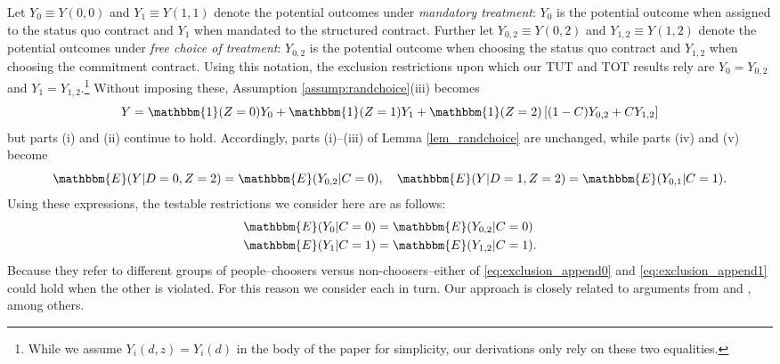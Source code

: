 \begin{appendix}
Let $Y_0 \equiv Y(0,0)$ and $Y_1 \equiv Y(1,1)$ denote the potential outcomes under \emph{mandatory treatment}: $Y_0$ is the potential outcome when assigned to the status quo contract and $Y_1$ when mandated to the structured contract. 
Further let $Y_{0,2} \equiv Y(0,2)$ and $Y_{1,2} \equiv Y(1,2)$ denote the potential outcomes under \emph{free choice of treatment}: $Y_{0,2}$ is the potential outcome when choosing the status quo contract and $Y_{1,2}$ when choosing the commitment contract. 
Using this notation, the exclusion restrictions upon which our TUT and TOT results rely are $Y_0 = Y_{0,2}$ and $Y_1 = Y_{1,2}$.\footnote{While we assume $Y_i(d,z) = Y_i(d)$ in the body of the paper for simplicity, our derivations only rely on these two equalities.}
Without imposing these, Assumption \ref{assump:randchoice}(iii) becomes 
\[
Y = \mathbbm{1}(Z =0) Y_{0} + \mathbbm{1}(Z = 1)  Y_{1}  + \mathbbm{1}(Z = 2) \left[(1 - C) Y_{0,2} + C Y_{1,2} \right]
\]
but parts (i) and (ii) continue to hold.
Accordingly, parts (i)--(iii) of Lemma \ref{lem_randchoice} are unchanged, while parts (iv) and (v) become
\[
\mathbbm{E}(Y|D=0,Z=2) = \mathbbm{E}(Y_{0,2}|C=0), \quad
\mathbbm{E}(Y|D=1,Z=2) = \mathbbm{E}(Y_{0,1}|C=1).
\]
Using these expressions, the testable restrictions we consider here are as follows:
\begin{align}
\label{eq:exclusion_append0}
\mathbbm{E}(Y_0|C=0) &= \mathbbm{E}(Y_{0,2}|C=0) \\
\label{eq:exclusion_append1}
\mathbbm{E}(Y_1|C=1) &= \mathbbm{E}(Y_{1,2}|C=1).
\end{align}
Because they refer to different groups of people--choosers versus non-choosers--either of \eqref{eq:exclusion_append0}  and \eqref{eq:exclusion_append1} could hold when the other is violated.
For this reason we consider each in turn.
Our approach is closely related to arguments from \cite{huber_mellace} and \cite{BinaryRegressor}, among others.


\end{appendix}
